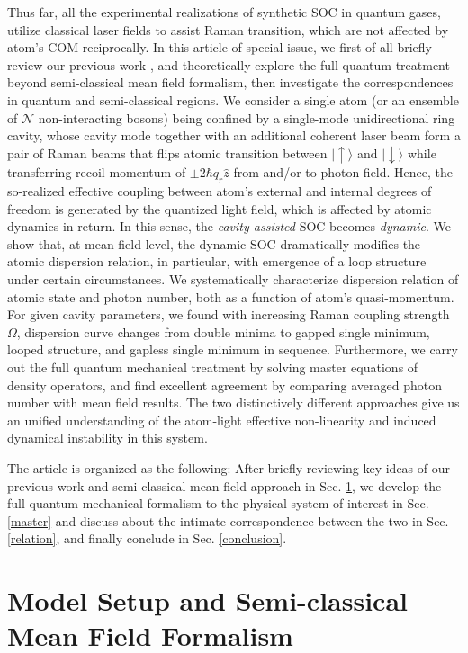 \documentclass[atoms,article,submit,moreauthors,pdftex,12pt,a4paper]{mdpi}
\begin{document}
Thus far, all the experimental realizations of synthetic SOC in quantum gases, utilize classical laser fields to assist Raman transition, which are not affected by atom's COM reciprocally. In this article of special issue, we first of all briefly review our previous work \cite{cavitySOC}, and theoretically explore the full quantum treatment beyond semi-classical mean field formalism, then investigate the correspondences in quantum and semi-classical regions. We consider a single atom (or an ensemble of $\mathcal{N}$ non-interacting  bosons) being confined by a single-mode unidirectional ring cavity, whose cavity mode together with an additional coherent laser beam form a pair of Raman beams that flips atomic transition between $|\uparrow\rangle$ and $|\downarrow\rangle$ while transferring recoil momentum of $\pm2\hbar q_r\hat{z}$ from and/or to photon field. Hence, the so-realized effective coupling between atom's external and internal degrees of freedom is generated by the quantized light field, which is affected by atomic dynamics in return. In this sense, the {\em cavity-assisted} SOC becomes {\em dynamic}. We show that, at mean field level, the dynamic SOC dramatically modifies the atomic dispersion relation, in particular, with emergence of a loop structure under certain circumstances. We systematically characterize dispersion relation of atomic state and photon number, both as a function of atom's quasi-momentum. For given cavity parameters, we found with increasing Raman coupling strength $\Omega$, dispersion curve changes from double minima to gapped single minimum, looped structure, and gapless single minimum in sequence. Furthermore, we carry out the full quantum mechanical treatment by solving master equations of density operators, and find excellent agreement by comparing averaged photon number with mean field results. The two distinctively different approaches give us an unified understanding of the atom-light effective non-linearity and induced dynamical instability in this system.

The article is organized as the following: After briefly reviewing key ideas of our previous work and semi-classical mean field approach in Sec. \ref{meanfield}, we develop the full quantum mechanical formalism to the physical system of interest in Sec. \ref{master} and discuss about the intimate correspondence between the two in Sec. \ref{relation}, and finally conclude in Sec. \ref{conclusion}. 

\section{Model Setup and Semi-classical Mean Field Formalism} \label{meanfield}
\end{document}
